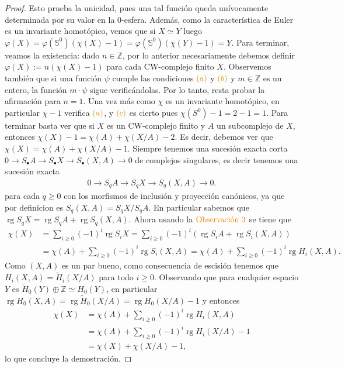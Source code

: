 \documentclass[11pt]{article}
\newcommand{\Z}{\mathbb{Z}}
\newcommand{\Ss}{\mathbb{S}}
\newcommand{\rg}{\operatorname{rg}}
\newcommand{\paint}[1]{\color{color}{#1}}
\begin{document}
\begin{proof}
Esto prueba la unicidad, pues una tal funci\'on queda un\'ivocamente determinada por su valor en la $0$-esfera. Adem\'as, como la caracter\'istica de Euler es un invariante homot\'opico, vemos que si $X \simeq Y$ luego $\varphi(X) = \varphi(\Ss^0)(\chi(X)-1) = \varphi(\Ss^0)(\chi(Y)-1) = Y$. Para terminar, veamos la existencia: dado $n \in \Z$, por lo anterior necesariamente debemos definir $\varphi(X) := n(\chi(X)-1)$ para cada CW-complejo finito $X$. Observemos tambi\'en que si una funci\'on $\psi$ cumple las condiciones $\paint{(a)}$ y $\paint{(b)}$ y $m \in \Z$ es un entero, la funci\'on $m \cdot \psi$ sigue verific\'andolas. Por lo tanto, resta probar la afirmaci\'on para $n = 1$. Una vez m\'as como $\chi$ es un invariante homot\'opico, en particular $\chi -1$ verifica $\paint{(a)}$, y $\paint{(c)}$ es cierto pues $\chi(S^0)-1 = 2-1 = 1$. Para terminar basta ver que si $X$ es un CW-complejo finito y $A$ un subcomplejo de $X$, entonces $\chi(X) -1 = \chi(A) + \chi(X/A) -2$. Es decir, debemos ver que $\chi(X) = \chi(A) + \chi(X/A) -1$. Siempre tenemos una sucesi\'on exacta corta $0 \to S_\bullet A \to S_\bullet X \to S_\bullet(X,A) \to 0$ de complejos singulares, es decir tenemos una sucesi\'on exacta
\begin{align*}
0 \to S_q A \to S_q X \to S_q(X,A) \to 0.
\end{align*}
para cada $q \geq 0$ con los morfismos de inclusi\'on y proyecci\'on can\'onicos, ya que por definicion es $S_q(X,A) = S_qX/S_qA$. En particular sabemos que $\rg S_qX = \rg S_qA + \rg S_q(X,A)$. Ahora usando la $\paint{\text{Observaci\'on $3$}}$ se tiene que
\begin{align*}
\chi(X) &= \sum_{i \geq 0}(-1)^i \rg S_iX = \sum_{i \geq 0}(-1)^i(\rg S_iA + \rg S_i(X,A))\\
&= \chi(A) + \sum_{i \geq 0}(-1)^i\rg S_i(X,A) = \chi(A) + \sum_{i \geq 0}(-1)^i\rg H_i(X,A).
\end{align*}
Como $(X,A)$ es un par bueno, como consecuencia de escisi\'on tenemos que $H_i(X,A) = \tilde{H}_i(X/A)$ para todo $i \geq 0$. Observando que para cualquier espacio $Y$ es $\tilde{H}_0(Y) \oplus \Z \simeq H_0(Y)$, en particular $\rg H_0(X,A) = \rg \tilde{H}_0(X/A) = \rg H_0(X/A) -1$ y entonces
\begin{align*}
\chi(X) &= \chi(A) + \sum_{i \geq 0}(-1)^i\rg H_i(X,A)\\
&= \chi(A) + \sum_{i \geq 0}(-1)^i\rg H_i(X/A) - 1\\
&= \chi(X) + \chi(X/A) -1,
\end{align*}
lo que concluye la demostraci\'on.
\end{proof}
\end{document}
